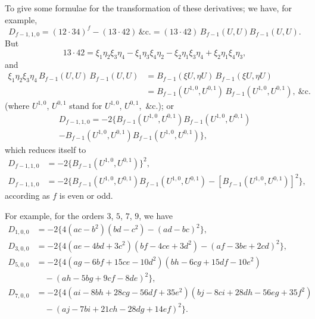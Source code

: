 \documentclass[11pt,a4paper]{book}
\begin{document}
To give some formulae for the transformation of these derivatives; we have, for
example,
\[
D_{f-1,1,0} = (12\cdot 34)^f - (13\cdot 42)\,\&\text{c.} = (13\cdot 42)\, B_{f-1}(U, U) B_{f-1}(U, U).
\]
But
\[
13\cdot 42 = \xi_1\eta_2\xi_3\eta_4 - \xi_1\eta_3\xi_4\eta_2 - \xi_2\eta_1\xi_3\eta_4 + \xi_2\eta_1\xi_4\eta_3,
\]
and
\begin{align*}
\xi_1\eta_2\xi_3\eta_4\, B_{f-1}(U, U)\, B_{f-1}(U, U)
&= B_{f-1}(\xi U, \eta U)\, B_{f-1}(\xi U, \eta U)\\
&= B_{f-1}(U^{1,0}, U^{0,1})\, B_{f-1}(U^{1,0}, U^{0,1}),\ \&\text{c.}
\end{align*}
(where $U^{1,0}$, $U^{0,1}$ stand for $U^{1,0}$, $U^{0,1}$,\ \&c.); or
\begin{multline*}
D_{f-1,1,0} = -2\{B_{f-1}(U^{1,0}, U^{0,1}) B_{f-1}(U^{1,0}, U^{0,1})\\
- B_{f-1}(U^{1,0}, U^{0,1}) B_{f-1}(U^{1,0}, U^{0,1})\},
\end{multline*}
which reduces itself to
\begin{align*}
D_{f-1,1,0} &= -2\{B_{f-1}(U^{1,0}, U^{0,1})\}^2,\\
D_{f-1,1,0} &= -2\{B_{f-1}(U^{1,0}, U^{0,1}) B_{f-1}(U^{1,0}, U^{0,1})
- [B_{f-1}(U^{1,0}, U^{0,1})]^2\},
\end{align*}
according as $f$ is even or odd.

\newpage
\setcounter{page}{107}

For example, for the orders $3$, $5$, $7$, $9$, we have
\begin{align*}
D_{1,0,0} &= -2\{4(ac-b^2)(bd-c^2) - (ad-bc)^2\},\\
D_{3,0,0} &= -2\{4(ae-4bd+3c^2)(bf-4ce+3d^2) - (af-3be+2cd)^2\},\\
D_{5,0,0} &= -2\{4(ag-6bf+15ce-10d^2)(bh-6cg+15df-10e^2)\\
&\quad - (ah-5bg+9cf-8de)^2\},\\
D_{7,0,0} &= -2\{4(ai-8bh+28cg-56df+35e^2)(bj-8ci+28dh-56eg+35f^2)\\
&\quad - (aj-7bi+21ch-28dg+14ef)^2\}.
\end{align*}
\end{document}
